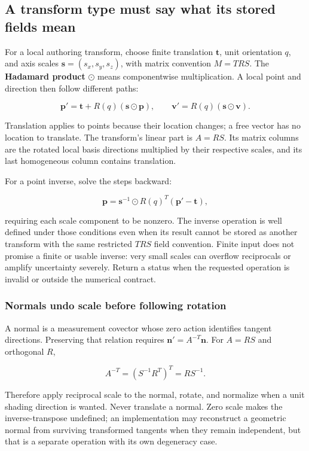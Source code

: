 \subsection{A transform type must say what its stored fields mean}\label{a-transform-type-must-say-what-its-stored-fields-mean}

For a local authoring transform, choose finite translation \(\mathbf t\), unit orientation \(q\), and axis scales \(\mathbf s=(s_x,s_y,s_z)\), with matrix convention \(M=TRS\). The \textbf{Hadamard product} \(\odot\) means componentwise multiplication. A local point and direction then follow different paths:

\[
\mathbf p'=\mathbf t+R(q)(\mathbf s\odot\mathbf p),
\qquad
\mathbf v'=R(q)(\mathbf s\odot\mathbf v).
\]

Translation applies to points because their location changes; a free vector has no location to translate. The transform's linear part is \(A=RS\). Its matrix columns are the rotated local basis directions multiplied by their respective scales, and its last homogeneous column contains translation.

For a point inverse, solve the steps backward:

\[
\mathbf p=\mathbf s^{-1}\odot R(q)^T(\mathbf p'-\mathbf t),
\]

requiring each scale component to be nonzero. The inverse operation is well defined under those conditions even when its result cannot be stored as another transform with the same restricted \(TRS\) field convention. Finite input does not promise a finite or usable inverse: very small scales can overflow reciprocals or amplify uncertainty severely. Return a status when the requested operation is invalid or outside the numerical contract.

\subsubsection{Normals undo scale before following rotation}\label{normals-undo-scale-before-following-rotation}

A normal is a measurement covector whose zero action identifies tangent directions. Preserving that relation requires \(\mathbf n'=A^{-T}\mathbf n\). For \(A=RS\) and orthogonal \(R\),

\[
A^{-T}=\left(S^{-1}R^T\right)^T=RS^{-1}.
\]

Therefore apply reciprocal scale to the normal, rotate, and normalize when a unit shading direction is wanted. Never translate a normal. Zero scale makes the inverse-transpose undefined; an implementation may reconstruct a geometric normal from surviving transformed tangents when they remain independent, but that is a separate operation with its own degeneracy case.

